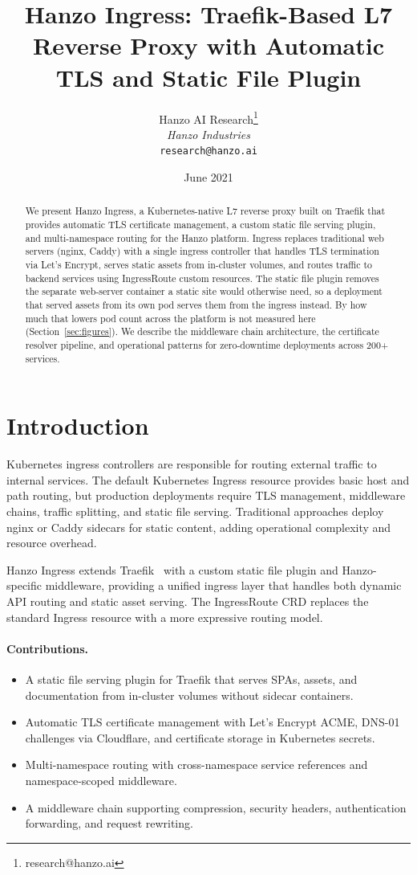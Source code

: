 \documentclass[11pt,twocolumn]{article}
\title{Hanzo Ingress: Traefik-Based L7 Reverse Proxy with Automatic TLS and Static File Plugin}
\author{Hanzo AI Research\thanks{research@hanzo.ai} \\ \textit{Hanzo Industries} \\ \texttt{research@hanzo.ai}}
\date{June 2021}
\begin{document}
\hanzocoverpage

\begin{abstract}
We present Hanzo Ingress, a Kubernetes-native L7 reverse proxy built on Traefik that provides automatic TLS certificate management, a custom static file serving plugin, and multi-namespace routing for the Hanzo platform. Ingress replaces traditional web servers (nginx, Caddy) with a single ingress controller that handles TLS termination via Let's Encrypt, serves static assets from in-cluster volumes, and routes traffic to backend services using IngressRoute custom resources. The static file plugin removes the separate web-server container a static site would otherwise need, so a deployment that served assets from its own pod serves them from the ingress instead. By how much that lowers pod count across the platform is not measured here (Section~\ref{sec:figures}). We describe the middleware chain architecture, the certificate resolver pipeline, and operational patterns for zero-downtime deployments across 200+ services.
\end{abstract}

\section{Introduction}

Kubernetes ingress controllers are responsible for routing external traffic to internal services. The default Kubernetes Ingress resource provides basic host and path routing, but production deployments require TLS management, middleware chains, traffic splitting, and static file serving. Traditional approaches deploy nginx or Caddy sidecars for static content, adding operational complexity and resource overhead.

Hanzo Ingress extends Traefik~\cite{traefik2016} with a custom static file plugin and Hanzo-specific middleware, providing a unified ingress layer that handles both dynamic API routing and static asset serving. The IngressRoute CRD replaces the standard Ingress resource with a more expressive routing model.

\paragraph{Contributions.}
\begin{itemize}
    \item A static file serving plugin for Traefik that serves SPAs, assets, and documentation from in-cluster volumes without sidecar containers.
    \item Automatic TLS certificate management with Let's Encrypt ACME, DNS-01 challenges via Cloudflare, and certificate storage in Kubernetes secrets.
    \item Multi-namespace routing with cross-namespace service references and namespace-scoped middleware.
    \item A middleware chain supporting compression, security headers, authentication forwarding, and request rewriting.
\end{itemize}
\end{document}
